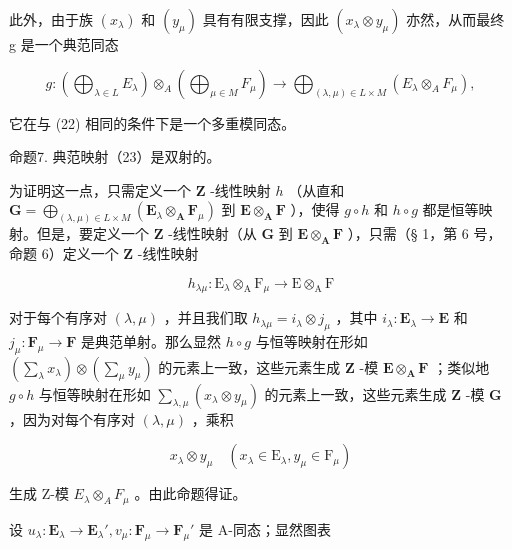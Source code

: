 此外，由于族 \((x_{\lambda})\) 和 \((y_{\mu})\) 具有有限支撑，因此 \((x_{\lambda} \otimes y_{\mu})\) 亦然，从而最终 g 是一个典范同态

\[
g: \left(\bigoplus_ {\lambda \in L} E _ {\lambda}\right) \otimes_ {A} \left(\bigoplus_ {\mu \in M} F _ {\mu}\right)\rightarrow \bigoplus_ {(\lambda , \mu) \in L \times M} (E _ {\lambda} \otimes_ {A} F _ {\mu}),\tag{23}
\]

它在与 (22) 相同的条件下是一个多重模同态。

命题7. 典范映射（23）是双射的。

为证明这一点，只需定义一个 \(\mathbf{Z}\) -线性映射 \(h\) （从直和 \(\mathbf{G} = \bigoplus_{(\lambda, \mu) \in L \times M} (\mathbf{E}_{\lambda} \otimes_{\mathbf{A}} \mathbf{F}_{\mu})\) 到 \(\mathbf{E} \otimes_{\mathbf{A}} \mathbf{F}\) ），使得 \(g \circ h\) 和 \(h \circ g\) 都是恒等映射。但是，要定义一个 \(\mathbf{Z}\) -线性映射（从 \(\mathbf{G}\) 到 \(\mathbf{E} \otimes_{\mathbf{A}} \mathbf{F}\) ），只需（§ 1，第 6 号，命题 6）定义一个 \(\mathbf{Z}\) -线性映射

\[
h _ {\lambda \mu}: \mathrm{E} _ {\lambda} \otimes_ {\mathrm{A}} \mathrm{F} _ {\mu} \rightarrow \mathrm{E} \otimes_ {\mathrm{A}} \mathrm{F}
\]

对于每个有序对 \((\lambda, \mu)\) ，并且我们取 \(h_{\lambda \mu} = i_{\lambda} \otimes j_{\mu}\) ，其中 \(i_{\lambda}: \mathbf{E}_{\lambda} \to \mathbf{E}\) 和 \(j_{\mu}: \mathbf{F}_{\mu} \to \mathbf{F}\) 是典范单射。那么显然 \(h \circ g\) 与恒等映射在形如 \(\left(\sum_{\lambda} x_{\lambda}\right) \otimes \left(\sum_{\mu} y_{\mu}\right)\) 的元素上一致，这些元素生成 \(\mathbf{Z}\) -模 \(\mathbf{E} \otimes_{\mathbf{A}} \mathbf{F}\) ；类似地 \(g \circ h\) 与恒等映射在形如 \(\sum_{\lambda, \mu} (x_{\lambda} \otimes y_{\mu})\) 的元素上一致，这些元素生成 \(\mathbf{Z}\) -模 \(\mathbf{G}\) ，因为对每个有序对 \((\lambda, \mu)\) ，乘积

\[
x _ {\lambda} \otimes y _ {\mu} \quad (x _ {\lambda} \in \mathrm{E} _ {\lambda}, y _ {\mu} \in \mathrm{F} _ {\mu})
\]

生成 Z-模 \(E_{\lambda} \otimes_{A} F_{\mu}\) 。由此命题得证。

设 \(u_{\lambda}: \mathbf{E}_{\lambda} \to \mathbf{E}_{\lambda}', v_{\mu}: \mathbf{F}_{\mu} \to \mathbf{F}_{\mu}'\) 是 A-同态；显然图表

